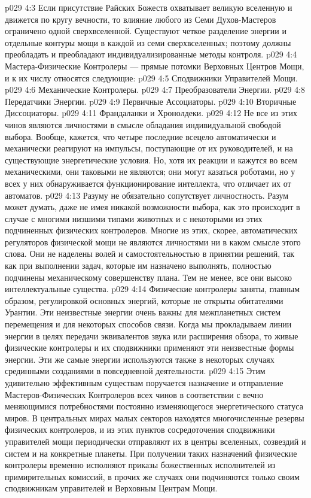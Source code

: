 \vs p029 4:3 Если присутствие Райских Божеств охватывает великую вселенную и движется по кругу вечности, то влияние любого из Семи Духов\hyp{}Мастеров ограничено одной сверхвселенной. Существуют четкое разделение энергии и отдельные контуры мощи в каждой из семи сверхвселенных; поэтому должны преобладать и преобладают индивидуализированные методы контроля.
\vs p029 4:4 \pc Мастера\hyp{}Физические Контролеры --- прямые потомки Верховных Центров Мощи, и к их числу относятся следующие:
\vs p029 4:5 \bibnobreakspace Сподвижники Управителей Мощи.
\vs p029 4:6 \bibnobreakspace Механические Контролеры.
\vs p029 4:7 \bibnobreakspace Преобразователи Энергии.
\vs p029 4:8 \bibnobreakspace Передатчики Энергии.
\vs p029 4:9 \bibnobreakspace Первичные Ассоциаторы.
\vs p029 4:10 \bibnobreakspace Вторичные Диссоциаторы.
\vs p029 4:11 \bibnobreakspace Франдаланки и Хронолдеки.
\vs p029 4:12 \pc Не все из этих чинов являются личностями в смысле обладания индивидуальной свободой выбора. Вообще, кажется, что четыре последние всецело автоматически и механически реагируют на импульсы, поступающие от их руководителей, и на существующие энергетические условия. Но, хотя их реакции и кажутся во всем механическими, они таковыми не являются; они могут казаться роботами, но у всех у них обнаруживается функционирование интеллекта, что отличает их от автоматов.
\vs p029 4:13 Разуму не обязательно сопутствует личностность. Разум может думать, даже не имея никакой возможности выбора, как это происходит в случае с многими низшими типами животных и с некоторыми из этих подчиненных физических контролеров. Многие из этих, скорее, автоматических регуляторов физической мощи не являются личностями ни в каком смысле этого слова. Они не наделены волей и самостоятельностью в принятии решений, так как при выполнении задач, которые им назначено выполнять, полностью подчинены механическому совершенству плана. Тем не менее, все они высоко интеллектуальные существа.
\vs p029 4:14 Физические контролеры заняты, главным образом, регулировкой основных энергий, которые не открыты обитателями Урантии. Эти неизвестные энергии очень важны для межпланетных систем перемещения и для некоторых способов связи. Когда мы прокладываем линии энергии в целях передачи эквивалентов звука или расширения обзора, то живые физические контролеры и их сподвижники применяют эти неизвестные формы энергии. Эти же самые энергии используются также в некоторых случаях срединными созданиями в повседневной деятельности.
\vs p029 4:15 \pc {}\bibnobreakspace {} Этим удивительно эффективным существам поручается назначение и отправление Мастеров\hyp{}Физических Контролеров всех чинов в соответствии с вечно меняющимися потребностями постоянно изменяющегося энергетического статуса миров. В центральных мирах малых секторов находятся многочисленные резервы физических контролеров, и из этих пунктов сосредоточения сподвижники управителей мощи периодически отправляют их в центры вселенных, созвездий и систем и на конкретные планеты. При получении таких назначений физические контролеры временно исполняют приказы божественных исполнителей из примирительных комиссий, в прочих же случаях они подчиняются только своим сподвижникам управителей и Верховным Центрам Мощи.
